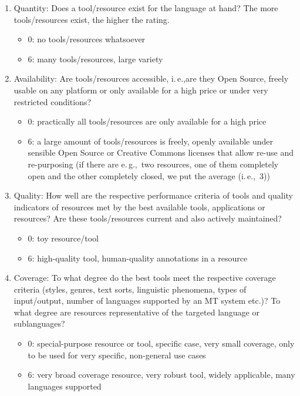 \begin{multicols}{2}
\begin{enumerate}
\item Quantity: Does a tool/resource exist for the language at hand? The more tools/resources exist, the higher the rating.
\begin{itemize}
\item 0: no tools/resources whatsoever
\item 6: many tools/resources, large variety
\end{itemize}
\item Availability: Are tools/resources accessible, i.\,e.,are they Open Source, freely usable on any platform or only available for a high price or under very restricted conditions?
\begin{itemize}
\item 0: practically all tools/resources are only available for a high price
\item 6: a large amount of tools/resources is freely, openly available under sensible Open Source or Creative Commons licenses that allow re-use and re-purposing (if there are e.\,g.,~two resources, one of them completely open and the other completely closed, we put the average (i.\,e.,~3))
\end{itemize}
\item Quality: How well are the respective performance criteria of tools and quality indicators of resources met by the best available tools, applications or resources? Are these tools/resources current and also actively maintained?
\begin{itemize}
\item 0: toy resource/tool
\item 6: high-quality tool, human-quality annotations in a resource
\end{itemize}
\item Coverage: To what degree do the best tools meet the respective coverage criteria (styles, genres, text sorts, linguistic phenomena, types of input/output, number of languages supported by an MT system etc.)? To what degree are resources representative of the targeted language or sublanguages?
\begin{itemize}
\item 0: special-purpose resource or tool, specific case, very small coverage, only to be used for very specific, non-general use cases
\item 6: very broad coverage resource, very robust tool, widely applicable, many languages supported
\end{itemize}

\end{enumerate}
\end{multicols}
